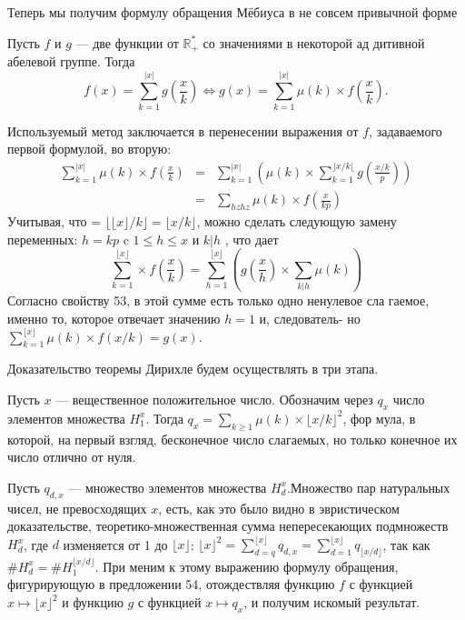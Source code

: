 \documentclass{mai_book}
\begin{document}
Теперь мы получим формулу обращения Мёбиуса в не совсем при­вычной форме

\begin{predl}
Пусть $f$ и $g$ — две функции от $\mathbb{R}_{+}^{*}$ со значениями в некоторой ад­
дитивной абелевой группе. Тогда
$$f(x)=\sum\limits_{k=1}^{|x|} g\left(\frac{x}{k}\right) \Longleftrightarrow g(x)=\sum\limits_{k=1}^{|x|}\mu(k)\times f\left(\frac{x}{k}\right).$$
\end{predl}
\begin{myproof}
Используемый метод заключается в перенесении выражения от $f$,
задаваемого первой формулой, во вторую:
$$\begin{array}{rcc}
\sum\limits_{k=1}^{|x|}\mu(k)\times f\left(\frac{x}{k}\right)&=&\sum\limits_{k=1}^{|x|}\left(\mu(k)\times\sum\limits_{k=1}^{\rfloor x/k \lfloor} g\left(\frac{x/k}{p}\right)\right)\\
&=&\sum\limits_{hzhz}\mu(k)\times f\left(\frac{x}{kp}\right)
\end{array}$$
Учитывая, что = $\lfloor\lfloor x \rfloor/k\rfloor = \lfloor x/k\rfloor$, можно сделать следующую замену
переменных: $h=kp$ c $1\leqslant h\leqslant x$ и $k|h$ , что дает
\newpage%
$$\sum\limits_{k=1}^{\lfloor x \rfloor}\times f\left(\frac{x}{k}\right)=\sum_{h=1}^{\lfloor x\rfloor}\left( g\left(\frac{x}{h}\right)\times\sum\limits_{k|h}\mu(k)\right)$$
Согласно свойству 53, в этой сумме есть только одно ненулевое сла­
гаемое, именно то, которое отвечает значению $h=1$ и, следователь-
но $\sum\nolimits_{k=1}^{\lfloor x\rfloor}\mu(k)\times f(x/k)=g(x)$.
\end{myproof}
Доказательство теоремы Дирихле будем осуществлять в три этапа.
\begin{lemma}
\hspace*{0.5cm}Пусть $x$ — вещественное положительное число. Обозначим через $q_{x}$
число элементов множества $H_{1}^x$. Тогда $q_{x}=\sum\nolimits_{k\geqslant 1}\mu(k)\times\lfloor x/k\rfloor^2$, фор­
мула, в которой, на первый взгляд, бесконечное число слагаемых, но
только конечное их число отлично от нуля.
\end{lemma}
\begin{myproof}
Пусть $q_{d,x}$ — множество элементов множества $H_{d}^x$.Множество пар
натуральных чисел, не превосходящих $x$, есть, как это было видно
в эвристическом доказательстве, теоретико-множественная сумма
непересекающих подмножеств $H_{d}^x$, где $d$ изменяется от 1 до $\lfloor x\rfloor$: $\lfloor x\rfloor^2=\sum\nolimits_{d=q}^{\lfloor x\rfloor}q_{d,x}=\sum\nolimits_{d=1}^{\lfloor x\rfloor}q_{\lfloor x/d\rfloor}$, так как $\#H_{d}^x=\#H_{1}^{\lfloor x/d\rfloor}$. При­
меним к этому выражению формулу обращения, фигурирующую в
предложении 54, отождествляя функцию $f$ с функцией $x\mapsto\lfloor x\rfloor^2$
 и функцию $g$ с функцией $x\mapsto q_{x}$, и получим искомый результат.
\end{myproof}
\end{document}
